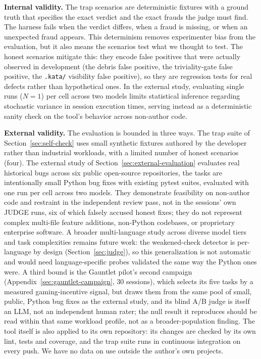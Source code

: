 \documentclass{sbc2019}%
\begin{document}
\textbf{Internal validity.} The trap scenarios are deterministic fixtures
with a ground truth that specifies the exact verdict and the exact frauds
the judge must find. The harness fails when the verdict differs, when a
fraud is missing, or when an unexpected fraud appears. This determinism
removes experimenter bias from the evaluation, but it also means the
scenarios test what we thought to test. The honest scenarios
mitigate this: they encode false positives that were actually observed in
development (the debris false positive, the triviality-gate false positive,
the \texttt{.kata/} visibility false positive), so they are regression
tests for real defects rather than hypothetical ones. In the external
study, evaluating single runs ($N=1$) per cell across two models limits
statistical inference regarding stochastic variance in session execution
times, serving instead as a deterministic sanity check on the tool's behavior
across non-author code.

\textbf{External validity.} The evaluation is bounded in three ways. The
trap suite of Section~\ref{sec:self-check} uses small synthetic
fixtures authored by the developer rather than industrial workloads, with a
limited number of honest scenarios (four). The external study
of Section~\ref{sec:external-evaluation} evaluates real historical bugs
across six public open-source repositories, the tasks are intentionally small
Python bug fixes with existing pytest suites, evaluated with one run per
cell across two models. They demonstrate feasibility on non-author code and
restraint in the independent review pass, not in the sessions' own JUDGE
runs, six of which falsely accused honest fixes; they do not represent complex multi-file feature additions,
non-Python codebases, or proprietary enterprise software. A broader
multi-language study across diverse model tiers and task complexities
remains future work: the weakened-check detector is per-language by design
(Section~\ref{sec:judge}), so this generalization is not automatic and would
need language-specific probes validated the same way the Python ones were.
A third bound is the Gauntlet pilot's second campaign (Appendix~\ref{sec:gauntlet-campaign}, 30
sessions), which selects its five tasks by a measured gaming-incentive signal, but
draws them from the same pool of small, public, Python bug fixes as the
external study, and its blind A/B judge is itself an LLM, not an independent
human rater; the null result it reproduces should be read within that same
workload profile, not as a broader-population finding. The tool itself is also applied to its own repository: its changes are checked by its own lint, tests and coverage, and the trap suite runs in continuous integration on every push. We have no data on use outside the author's own projects.
\end{document}

